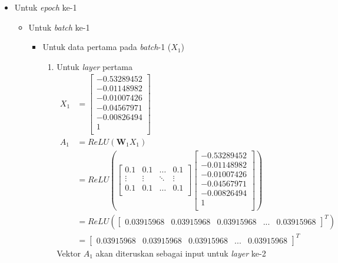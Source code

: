 \documentclass[a4paper,12pt]{report}
\begin{document}
\begin{itemize}
	\item Untuk \textit{epoch} ke-1
	\begin{itemize}
		\item Untuk \textit{batch} ke-1
		\begin{itemize}
			\item Untuk data pertama pada \textit{batch}-1 ($X_1$)
			\begin{enumerate}
				\item Untuk \textit{layer} pertama
				\begin{equation}
					\begin{split}
						X_1 &= \begin{bmatrix}
							-0.53289452 \\
							-0.01148982 \\
							-0.01007426 \\
							-0.04567971 \\
							-0.00826494 \\
							1 \\
						\end{bmatrix} \\
						A_1 &= \textit{ReLU}(\mathbf{W}_1X_1) \\
						&= ReLU \left(
						\begin{bmatrix}
							0.1 & 0.1 & \dots & 0.1 \\
							\vdots & \vdots & \ddots & \vdots \\
							0.1 & 0.1 & \dots & 0.1 \\
						\end{bmatrix} \begin{bmatrix}
						-0.53289452 \\
						-0.01148982 \\
						-0.01007426 \\
						-0.04567971 \\
						-0.00826494 \\
						1 \\
						\end{bmatrix}
						\right) \\ 
						&= ReLU \left(\begin{bmatrix} 0.03915968 &  0.03915968 & 0.03915968 & ... &  0.03915968 \end{bmatrix}^{T} \right) \\
						&= \begin{bmatrix} 0.03915968 &  0.03915968 & 0.03915968 & ... &  0.03915968 \end{bmatrix}^{T}
					\end{split}
				\end{equation}
				Vektor $A_1$ akan diteruskan sebagai input untuk \textit{layer} ke-2
				

\end{enumerate}
\end{itemize}
\end{itemize}
\end{itemize}
\end{document}
